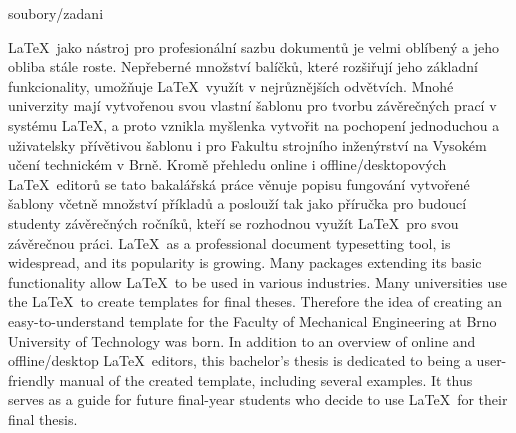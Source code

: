 \documentclass[12pt,a4paper,twoside]{book}
\begin{document}


\cleardoublepage


	     {soubory/zadani}

\cleardoublepage

\abstrakt
{\LaTeX\ jako nástroj pro profesionální sazbu dokumentů je velmi oblíbený a jeho obliba stále roste. Nepřeberné množství balíčků, které rozšiřují jeho základní funkcionality, umožňuje \LaTeX\ využít v nejrůznějších odvětvích. Mnohé univerzity mají vytvořenou svou vlastní šablonu pro tvorbu závěrečných prací v systému \LaTeX, a proto vznikla myšlenka vytvořit na pochopení jednoduchou a uživatelsky přívětivou šablonu i pro Fakultu strojního inženýrství na Vysokém učení technickém v Brně. Kromě přehledu online i offline/desktopových \LaTeX\ editorů se tato bakalářská práce věnuje popisu fungování vytvořené šablony včetně množství příkladů a poslouží tak jako příručka pro budoucí studenty závěrečných ročníků, kteří se rozhodnou využít \LaTeX\ pro svou závěrečnou práci.}
{\LaTeX\, as a professional document typesetting tool, is widespread, and its popularity is growing. Many packages extending its basic functionality allow \LaTeX\ to be used in various industries. Many universities use the \LaTeX\ to create templates for final theses. Therefore the idea of creating an easy-to-understand template for the Faculty of Mechanical Engineering at Brno University of Technology was born. In addition to an overview of online and offline/desktop \LaTeX\ editors, this bachelor's thesis is dedicated to being a user-friendly manual of the created template, including several examples. It thus serves as a guide for future final-year students who decide to use \LaTeX\ for their final thesis.}
\end{document}
